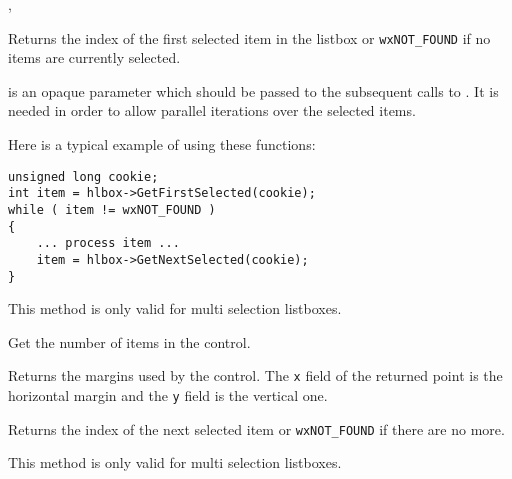 , 


\label{wxvlistboxgetfirstselected}


Returns the index of the first selected item in the listbox or
{\tt wxNOT\_FOUND} if no items are currently selected.

 is an opaque parameter which should be passed to the subsequent
calls to . It is needed in
order to allow parallel iterations over the selected items.

Here is a typical example of using these functions:
\begin{verbatim}
unsigned long cookie;
int item = hlbox->GetFirstSelected(cookie);
while ( item != wxNOT_FOUND )
{
    ... process item ...
    item = hlbox->GetNextSelected(cookie);
}
\end{verbatim}

This method is only valid for multi selection listboxes.


\label{wxvlistboxgetitemcount}


Get the number of items in the control.




\label{wxvlistboxgetmargins}


Returns the margins used by the control. The {\tt x} field of the returned
point is the horizontal margin and the {\tt y} field is the vertical one.




\label{wxvlistboxgetnextselected}


Returns the index of the next selected item or {\tt wxNOT\_FOUND} if there are
no more.

This method is only valid for multi selection listboxes.

